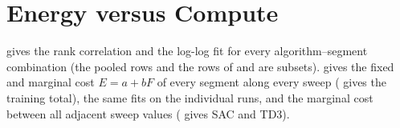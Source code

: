 \section{Energy versus Compute}\label{sec:app-full-ec}

 gives the rank correlation and the log-log fit for every algorithm--segment combination (the pooled rows and the rows of  and  are subsets).
 gives the fixed and marginal cost $E=a+bF$ of every segment along every sweep ( gives the training total),  the same fits on the individual runs, and  the marginal cost between all adjacent sweep values ( gives SAC and TD3).

